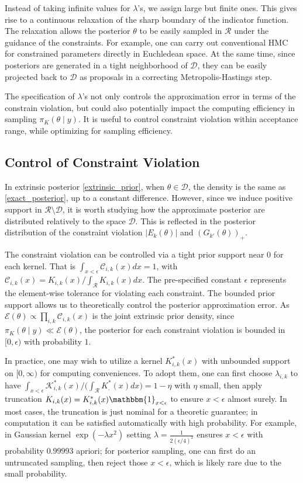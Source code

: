 \documentclass[10pt]{article}
\newcommand{\mc}[1]{\mathcal{#1}}
\begin{document}
Instead of taking infinite values for $\lambda$'s, we assign large but finite ones. This gives rise to a continuous relaxation of the sharp boundary of the indicator function. The relaxation allows the posterior $\theta$ to be easily sampled in $\mc R$ under the guidance of the constraints. For example, one can carry out conventional HMC for constrained parameters directly in Euchledean space. At the same time, since posteriors are generated in a tight neighborhood of $\mc D$, they can be easily projected back to $\mc D$ as proposals in a correcting Metropolis-Hastings step.

The specification of $\lambda$'s not only controls the approximation error in terms of the constrain violation, but could also potentially impact the computing efficiency in sampling $\pi_{K}(\theta \mid y)$. It is useful to control constraint violation within acceptance range, while optimizing for sampling efficiency.

\subsection{Control of Constraint Violation}

In extrinsic posterior \eqref{extrinsic_prior}, when $\theta \in \mc D$, the density is the same as \eqref{exact_posterior}, up to a constant difference. However, since we induce positive support in $\mc R \setminus \mc D$, it is worth studying how the approximate posterior are distributed relatively to the space $\mc D$. This is reflected in the posterior distribution of the constraint violation $|E_k(\theta)|$ and $(G_{k'}(\theta))_+$.

The constraint violation can be controlled via a tight prior support near $0$ for each kernel.  That is $\int_{x<\epsilon} \mc C_{i,k}(x)  dx= 1$, with  $\mc C_{i,k}(x) = K_{i,k}(x) / \int_{\mc R}K_{i,k}(x) dx$. The pre-specified constant $\epsilon$ represents the element-wise tolerance for violating each constraint. The bounded prior support allows us to theoretically control the posterior approximation error. As $\mc E(\theta) \propto \prod_{i,k} \mc C_{i,k}(x)$ is the joint extrinsic prior density, since $\pi_K(\theta \mid y) \ll \mc E(\theta)$, the posterior for each constraint violation is bounded in $[0,\epsilon)$ with probability $1$.

In practice, one may wish to utilize a kernel $K^*_{i,k}(x)$ with unbounded support on $[0,\infty)$ for computing conveniences. To adopt them, one can first choose $\lambda_{i,k}$ to have $\int_{x<\epsilon} \mc K^*_{i,k}(x)/ \big( \int_{\mc R} K^*_{.}(x) dx\big ) = 1-\eta$ with $\eta$ small, then apply truncation $K_{i,k}(x)= K^*_{i,k}(x) \mathbbm{1}_{x<\epsilon}$ to ensure $x<\epsilon$ almost surely. In most cases, the truncation is just nominal for a theoretic guarantee; in computation it can be satisfied automatically with high probability. For example, in Gaussian kernel $\exp( -{\lambda x^2})$ setting $\lambda = \frac{1}{ 2(\epsilon/4)^2}$ ensures $x<\epsilon$ with probability $0.99993$ apriori; for posterior sampling, one can first do an untruncated sampling, then reject those $x<\epsilon$, which is likely rare due to the small probability. 
\end{document}
